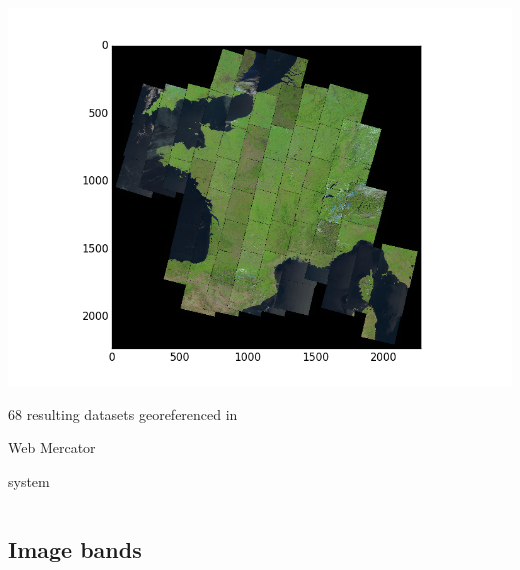 \documentclass[c]{beamer}
\begin{document}
\begin{frame}
\begin{columns}[t]
\begin{column}{0.50\textwidth}
\begin{overlayarea}{\linewidth}{4cm}
  \centering\vfill
  \includegraphics[scale=0.25]{images/importing/france-covering.png}
\end{overlayarea}
\begin{overlayarea}{\linewidth}{1cm}
  \centering
  \scriptsize 68 resulting datasets georeferenced in \begin{itshape}Web Mercator\end{itshape} system\par
\end{overlayarea}
\end{column}
\end{columns}

\end{frame}

\subsection{Image bands}
\begin{frame}
\tableofcontents[currentsubsection]
\end{frame}
\end{document}
